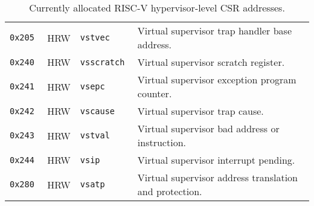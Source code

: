 \begin{table}[htb!]
\begin{center}
\begin{tabular}{|l|l|l|l|}
\tt 0x205 & HRW  &\tt vstvec     & Virtual supervisor trap handler base address. \\
\tt 0x240 & HRW  &\tt vsscratch  & Virtual supervisor scratch register. \\
\tt 0x241 & HRW  &\tt vsepc      & Virtual supervisor exception program counter. \\
\tt 0x242 & HRW  &\tt vscause    & Virtual supervisor trap cause. \\
\tt 0x243 & HRW  &\tt vstval     & Virtual supervisor bad address or instruction. \\
\tt 0x244 & HRW  &\tt vsip       & Virtual supervisor interrupt pending. \\
\tt 0x280 & HRW  &\tt vsatp      & Virtual supervisor address translation and protection. \\
\hline
\end{tabular}
\end{center}
\caption{Currently allocated RISC-V hypervisor-level CSR addresses.}
\label{hcsrnames}
\end{table}


